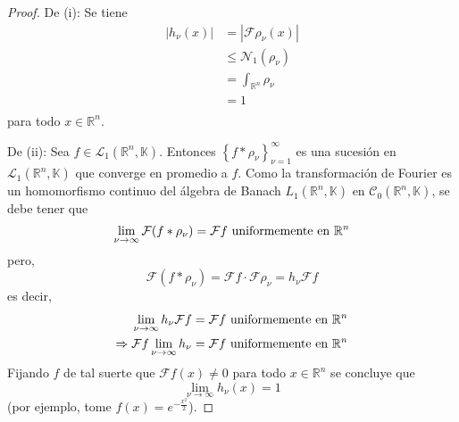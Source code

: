\documentclass[12pt]{report}
\theoremstyle{largebreak}
\renewcommand{\leq}{\ensuremath{\leqslant}}
\newcommand\abs[1]{\ensuremath{\left|#1\right|}}
\newcommand{\N}[2]{\ensuremath{\mathcal{N}_{#1}\left(#2\right)}}
\newcommand{\fou}[1]{\ensuremath{\mathcal{F}#1}}
\begin{document}
    \begin{proof}
        De (i): Se tiene
        \begin{equation*}
            \begin{split}
                \abs{h_\nu(x)}&=\abs{\fou{\rho_\nu}(x)}\\
                &\leq\N{1}{\rho_\nu}\\
                &=\int_{\mathbb{R}^n}\rho_\nu\\
                &=1\\
            \end{split}
        \end{equation*}
        para todo $x\in\mathbb{R}^n$.

        De (ii): Sea $f\in\mathcal{L}_1(\mathbb{R}^n,\mathbb{K})$. Entonces $\left\{f*\rho_\nu \right\}_{ \nu=1}^\infty$ es una sucesión en $\mathcal{L}_1(\mathbb{R}^n,\mathbb{K})$ que converge en promedio a $f$. Como la transformación de Fourier es un homomorfismo continuo del álgebra de Banach $L_1(\mathbb{R}^n,\mathbb{K})$ en $\mathcal{C}_0(\mathbb{R}^n,\mathbb{K})$, se debe tener que
        \begin{equation*}
            \lim_{\nu\rightarrow\infty}\fou{(f*\rho_\nu)}=\fou{f}\textup{ uniformemente en }\mathbb{R}^n
        \end{equation*}
        pero,
        \begin{equation*}
            \fou{(f*\rho_\nu)}=\fou{f}\cdot\fou{\rho_\nu}=h_\nu\fou{f}
        \end{equation*}
        es decir,
        \begin{equation*}
            \begin{split}
                \lim_{\nu\rightarrow\infty}h_\nu\fou{f}&=\fou{f}\textup{ uniformemente en }\mathbb{R}^n\\
                \Rightarrow \fou{f}\lim_{\nu\rightarrow\infty}h_\nu&=\fou{f}\textup{ uniformemente en }\mathbb{R}^n\\
            \end{split}
        \end{equation*}
        Fijando $f$ de tal suerte que $\fou{f}(x)\neq0$ para todo $x\in\mathbb{R}^n$ se concluye que
        \begin{equation*}
            \lim_{\nu\rightarrow\infty}h_\nu(x)=1
        \end{equation*}
        (por ejemplo, tome $f(x)=e^{-\frac{x^2}{2}}$).
    \end{proof}
\end{document}
